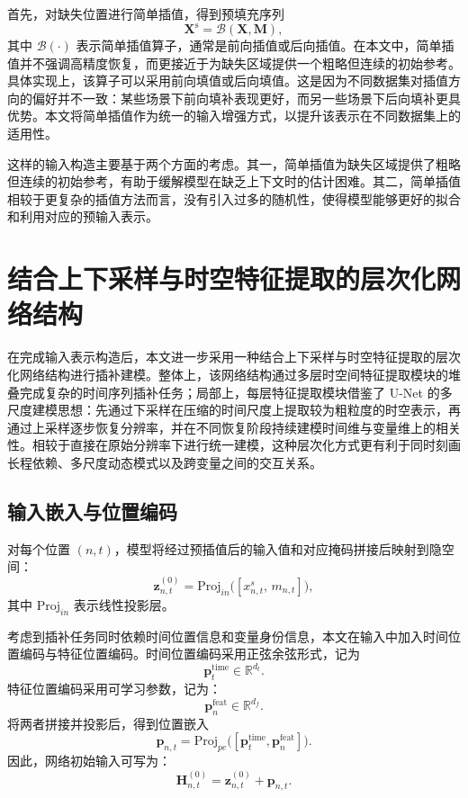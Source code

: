 首先，对缺失位置进行简单插值，得到预填充序列
\begin{equation}
\mathbf{X}^{\mathrm{s}} = \mathcal{B}(\mathbf{X}, \mathbf{M}),
\end{equation}
其中 \(\mathcal{B}(\cdot)\) 表示简单插值算子，通常是前向插值或后向插值。在本文中，简单插值并不强调高精度恢复，而更接近于为缺失区域提供一个粗略但连续的初始参考。具体实现上，该算子可以采用前向填值或后向填值。这是因为不同数据集对插值方向的偏好并不一致：某些场景下前向填补表现更好，而另一些场景下后向填补更具优势。本文将简单插值作为统一的输入增强方式，以提升该表示在不同数据集上的适用性。


这样的输入构造主要基于两个方面的考虑。其一，简单插值为缺失区域提供了粗略但连续的初始参考，有助于缓解模型在缺乏上下文时的估计困难。其二，简单插值相较于更复杂的插值方法而言，没有引入过多的随机性，使得模型能够更好的拟合和利用对应的预输入表示。    
    
\section{结合上下采样与时空特征提取的层次化网络结构}

在完成输入表示构造后，本文进一步采用一种结合上下采样与时空特征提取的层次化网络结构进行插补建模。整体上，该网络结构通过多层时空间特征提取模块的堆叠完成复杂的时间序列插补任务；局部上，每层特征提取模块借鉴了 U-Net\cite{DBLP:conf/miccai/RonnebergerFB15} 的多尺度建模思想：先通过下采样在压缩的时间尺度上提取较为粗粒度的时空表示，再通过上采样逐步恢复分辨率，并在不同恢复阶段持续建模时间维与变量维上的相关性。相较于直接在原始分辨率下进行统一建模，这种层次化方式更有利于同时刻画长程依赖、多尺度动态模式以及跨变量之间的交互关系。

\subsection{输入嵌入与位置编码}

对每个位置 \((n,t)\)，模型将经过预插值后的输入值和对应掩码拼接后映射到隐空间：
\begin{equation}
\mathbf{z}_{n,t}^{(0)} = \mathrm{Proj}_{in}\bigl([x^{s}_{n,t},\, m_{n,t}]\bigr),
\end{equation}
其中 \(\mathrm{Proj}_{in}\) 表示线性投影层。

考虑到插补任务同时依赖时间位置信息和变量身份信息，本文在输入中加入时间位置编码与特征位置编码。时间位置编码采用正弦余弦形式，记为
\begin{equation}
\mathbf{p}^{\mathrm{time}}_t \in \mathbb{R}^{d_t}.
\end{equation}
特征位置编码采用可学习参数，记为：
\begin{equation}
\mathbf{p}^{\mathrm{feat}}_n \in \mathbb{R}^{d_f}.
\end{equation}
将两者拼接并投影后，得到位置嵌入
\begin{equation}
\mathbf{p}_{n,t} = \mathrm{Proj}_{pe}\bigl([\mathbf{p}^{\mathrm{time}}_t,\mathbf{p}^{\mathrm{feat}}_n]\bigr).
\end{equation}
因此，网络初始输入可写为：
\begin{equation}
\mathbf{H}^{(0)}_{n,t} = \mathbf{z}_{n,t}^{(0)} + \mathbf{p}_{n,t}.
\end{equation}

